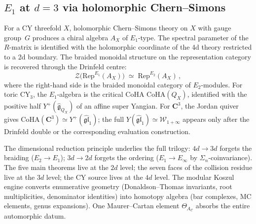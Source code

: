 \documentclass[11pt,reqno]{amsart}
\theoremstyle{definition}
\theoremstyle{remark}
\providecommand{\fg}{\mathfrak{g}}
\renewcommand{\Bbbk}{\mathbf{C}}
\numberwithin{equation}{section}
\begin{document}
\subsection{$E_1$ at $d = 3$ via holomorphic Chern--Simons}
\label{ssec:e1-holcs}

For a CY threefold $X$, holomorphic Chern--Simons theory
on $X$ with gauge group~$G$ produces a chiral algebra
$A_X$ of $E_1$-type. The spectral parameter of the
$R$-matrix is identified with the holomorphic coordinate
of the 4d theory restricted to a 2d boundary. The
braided monoidal structure on the representation category is
recovered through the Drinfeld centre:
\begin{equation}\label{eq:drinfeld-centre}
\mathcal{Z}\bigl(\mathrm{Rep}^{E_1}(A_X)\bigr)
\;\simeq\;
\mathrm{Rep}^{E_2}(A_X)\,,
\end{equation}
where the right-hand side is the braided monoidal category of
$E_2$-modules. For toric CY$_3$, the $E_1$-algebra is the
critical CoHA $\mathrm{CoHA}(Q_X)$, identified with the positive
half $Y^+(\widehat{\fg}_{Q_X})$ of an affine super Yangian. For
$\Bbbk^3$, the Jordan quiver gives
$\mathrm{CoHA}(\Bbbk^3)\simeq Y^+(\widehat{\mathfrak{gl}}_1)$;
the full $Y(\widehat{\mathfrak{gl}}_1)\simeq
\mathcal{W}_{1+\infty}$ appears only after the Drinfeld double or
the corresponding evaluation construction.

The dimensional reduction principle underlies the full trilogy:
$4d \to 3d$ forgets the braiding ($E_2 \to E_1$); $3d \to 2d$
forgets the ordering ($E_1 \to E_\infty$ by
$\Sigma_n$-coinvariance). The five main theorems live at the
$2d$ level; the seven faces of the collision residue live at
the $3d$ level; the CY source lives at the $4d$ level. The
modular Koszul engine converts enumerative geometry
(Donaldson--Thomas invariants, root multiplicities, denominator
identities) into homotopy algebra (bar complexes, MC elements,
genus expansions). One Maurer--Cartan element
$\Theta_{A_\mathcal{C}}$ absorbs the entire automorphic datum.



\end{document}

